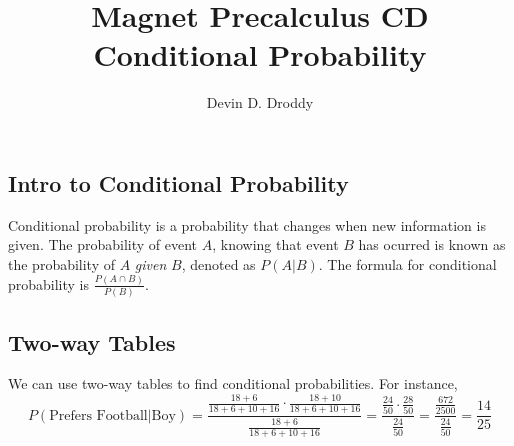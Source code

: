 \documentclass{report}
\title{\Huge{Magnet Precalculus CD}\\Conditional Probability}
\author{\huge{Devin D. Droddy}}
\date{}
\begin{document}
\maketitle
\newpage%
\tableofcontents
\pagebreak

\chapter{}

\section{Intro to Conditional Probability}

Conditional probability is a probability that changes when new information is given. The probability of event $A$, knowing that event $B$ has ocurred is known as the probability of $A$ \textit{given} $B$, denoted as $P(A|B)$. The formula for conditional probability is $\frac{P(A \cap B)}{P(B)}$.

\section{Two-way Tables}



We can use two-way tables to find conditional probabilities. For instance,
\[
	P(\text{Prefers Football} | \text{Boy})=\frac{\frac{18 + 6}{18 + 6 + 10 + 16} \cdot \frac{18 + 10}{18 + 6 + 10 + 16}}{\frac{18 + 6}{18 + 6 + 10 + 16}}=\frac{\frac{24}{50} \cdot \frac{28}{50}}{\frac{24}{50}}=\frac{\frac{672}{2500}}{\frac{24}{50}}=\frac{14}{25}
\]
\end{document}
